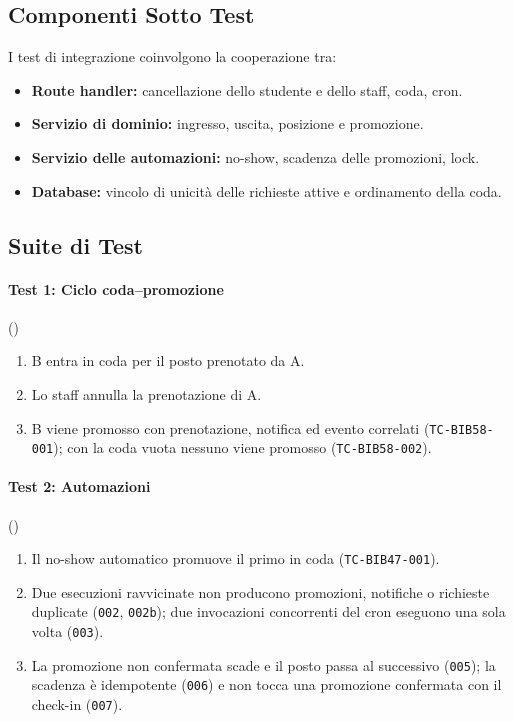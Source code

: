 \documentclass[11pt,a4paper,oneside,openany]{book}
\begin{document}
\subsection{Componenti Sotto Test}

I test di integrazione coinvolgono la cooperazione tra:
\begin{itemize}
  \item \textbf{Route handler:} cancellazione dello studente e dello staff,
        coda, cron.
  \item \textbf{Servizio di dominio:} ingresso, uscita, posizione e
        promozione.
  \item \textbf{Servizio delle automazioni:} no-show, scadenza delle
        promozioni, lock.
  \item \textbf{Database:} vincolo di unicità delle richieste attive e
        ordinamento della coda.
\end{itemize}

\subsection{Suite di Test}

\paragraph{Test 1: Ciclo coda--promozione}
()
\begin{enumerate}
  \item B entra in coda per il posto prenotato da A.
  \item Lo staff annulla la prenotazione di A.
  \item B viene promosso con prenotazione, notifica ed evento correlati
        (\texttt{TC-BIB58-001}); con la coda vuota nessuno viene promosso
        (\texttt{TC-BIB58-002}).
\end{enumerate}

\paragraph{Test 2: Automazioni} ()
\begin{enumerate}
  \item Il no-show automatico promuove il primo in coda (\texttt{TC-BIB47-001}).
  \item Due esecuzioni ravvicinate non producono promozioni, notifiche o
        richieste duplicate (\texttt{002}, \texttt{002b}); due invocazioni
        concorrenti del cron eseguono una sola volta (\texttt{003}).
  \item La promozione non confermata scade e il posto passa al successivo
        (\texttt{005}); la scadenza è idempotente (\texttt{006}) e non tocca
        una promozione confermata con il check-in (\texttt{007}).
\end{enumerate}
\end{document}
